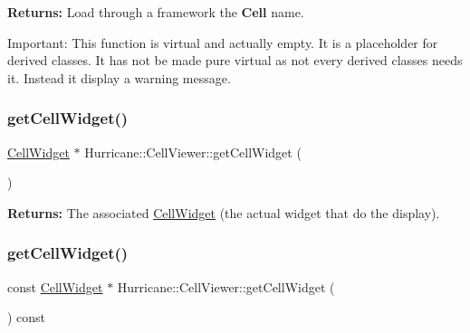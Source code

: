 {\bfseries Returns\+:} Load through a framework the \textbf{ Cell} {\ttfamily name}.

\begin{DoxyParagraph}{Important\+:}
This function is virtual and actually empty. It is a placeholder for derived classes. It has not be made pure virtual as not every derived classes needs it. Instead it display a warning message. 
\end{DoxyParagraph}
\mbox{\label{classHurricane_1_1CellViewer_a1d57547e30b1fb51aec2d0f254be6d3e}} 
\subsubsection{\texorpdfstring{get\+Cell\+Widget()}{getCellWidget()}\hspace{0.1cm}{\footnotesize\ttfamily [1/2]}}
{\footnotesize\ttfamily \hyperlink{classHurricane_1_1CellWidget}{Cell\+Widget} $\ast$ Hurricane\+::\+Cell\+Viewer\+::get\+Cell\+Widget (\begin{DoxyParamCaption}{ }\end{DoxyParamCaption})\hspace{0.3cm}{\ttfamily [inline]}}

{\bfseries Returns\+:} The associated \hyperlink{classHurricane_1_1CellWidget}{Cell\+Widget} (the actual widget that do the display). \mbox{\label{classHurricane_1_1CellViewer_acbfd53db10dd9de11acbb2940bce10bd}} 
\subsubsection{\texorpdfstring{get\+Cell\+Widget()}{getCellWidget()}\hspace{0.1cm}{\footnotesize\ttfamily [2/2]}}
{\footnotesize\ttfamily const \hyperlink{classHurricane_1_1CellWidget}{Cell\+Widget} $\ast$ Hurricane\+::\+Cell\+Viewer\+::get\+Cell\+Widget (\begin{DoxyParamCaption}{ }\end{DoxyParamCaption}) const\hspace{0.3cm}{\ttfamily [inline]}}

